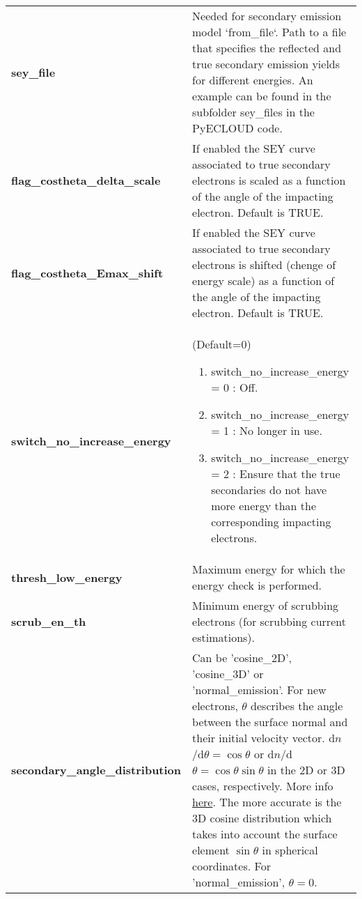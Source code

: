 \documentclass[a4paper,12pt]{article}
\begin{document}
\begin{longtable}{p{}p{}}
\hline\endfirsthead\hline\endhead\rowcolor{Gray}
\multicolumn{2}{p{.97\textwidth}}{
\textbf{Other parameters}}\\ \hline
\textbf{sey\_file} & Needed for secondary emission model `from\_file`.
    Path to a file that specifies the reflected and true secondary emission yields for different energies.
    An example can be found in the subfolder sey\_files in the PyECLOUD code.\\\hline
\textbf{flag\_costheta\_delta\_scale} & If enabled the SEY curve associated to true secondary electrons is scaled as a function of the angle of the impacting electron. Default is TRUE.\\ \hline
\textbf{flag\_costheta\_Emax\_shift} & If enabled the SEY curve associated to true secondary electrons is shifted (chenge of energy scale) as a function of the angle of the impacting electron. Default is TRUE.\\ \hline
\textbf{switch\_no\_increase\_energy}&	(Default=0)
\begin{enumerate}
\item	switch\_no\_increase\_energy = 0 : Off.
\item switch\_no\_increase\_energy = 1 : No longer in use.
\item switch\_no\_increase\_energy = 2 : Ensure that the true secondaries do not have more energy than the corresponding impacting electrons.
\end{enumerate}\\
\hline
\textbf{thresh\_low\_energy}&	Maximum energy for which the energy check is performed.\\ \hline
\textbf{scrub\_en\_th}&	Minimum energy of scrubbing electrons (for scrubbing current estimations).\\
\hline
\textbf{secondary\_angle\_distribution} & Can be 'cosine\_2D', 'cosine\_3D' or 'normal\_emission'.
    For new electrons, $\theta$ describes the angle between the surface normal and their initial velocity vector.
    d$n$/d$\theta=\cos\theta$ or d$n$/d$\theta=\cos\theta\sin\theta$ in the 2D or 3D cases, respectively. More info \href{http://www.sciencedirect.com/science/article/pii/S0042207X02001732}{here}.
The more accurate is the 3D cosine distribution which takes into account the surface element $\sin\theta$ in spherical coordinates. For 'normal\_emission', $\theta = 0$.
\\ \hline
\end{longtable}
\end{document}
